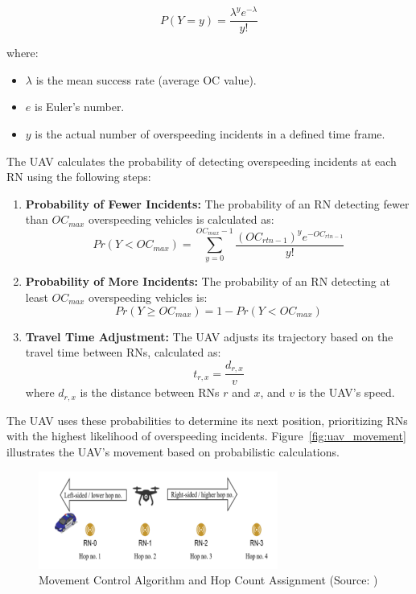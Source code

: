 \begin{equation}
P(Y = y) = \frac{\lambda^y e^{-\lambda}}{y!}
\label{eq:poisson}
\end{equation}

where:
\begin{itemize}
    \item \( \lambda \) is the mean success rate (average OC value).
    \item \( e \) is Euler’s number.
    \item \( y \) is the actual number of overspeeding incidents in a defined time frame.
\end{itemize}

The UAV calculates the probability of detecting overspeeding incidents at each RN using the following steps:
\begin{enumerate}
    \item \textbf{Probability of Fewer Incidents:} The probability of an RN detecting fewer than \( OC_{max} \) overspeeding vehicles is calculated as:
    \begin{equation}
    Pr(Y < OC_{max}) = \sum_{y=0}^{OC_{max}-1} \frac{(OC_{rtn-1})^y e^{-OC_{rtn-1}}}{y!}
    \label{eq:prob_less}
    \end{equation}

    \item \textbf{Probability of More Incidents:} The probability of an RN detecting at least \( OC_{max} \) overspeeding vehicles is:
    \begin{equation}
    Pr(Y \geq OC_{max}) = 1 - Pr(Y < OC_{max})
    \label{eq:prob_more}
    \end{equation}

    \item \textbf{Travel Time Adjustment:} The UAV adjusts its trajectory based on the travel time between RNs, calculated as:
    \begin{equation}
    t_{r,x} = \frac{d_{r,x}}{v}
    \label{eq:travel_time}
    \end{equation}
    where \( d_{r,x} \) is the distance between RNs \( r \) and \( x \), and \( v \) is the UAV’s speed.
\end{enumerate}

The UAV uses these probabilities to determine its next position, prioritizing RNs with the highest likelihood of overspeeding incidents. Figure~\ref{fig:uav_movement} illustrates the UAV’s movement based on probabilistic calculations.

\begin{figure}[h]
    \centering
    \includegraphics[width=0.7\textwidth]{Figures/Chapter3/Method6/2.png}
    \caption{Movement Control Algorithm and Hop Count Assignment (Source: \cite{bashir2022closed})}
    \label{fig:hop_numbers}
\end{figure}

